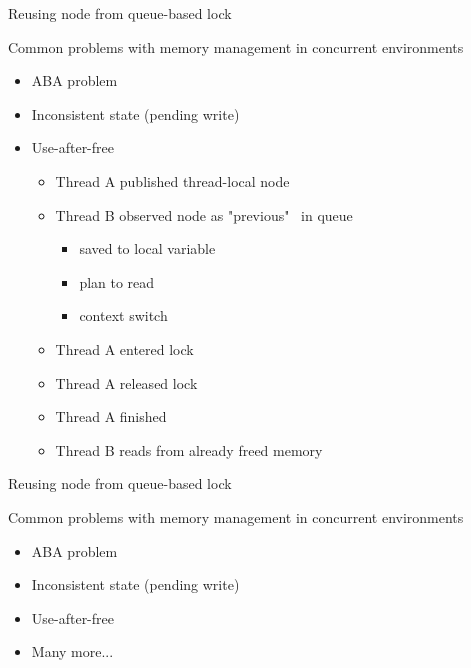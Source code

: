 \begin{frame}[t,noframenumbering]{Reusing node from queue-based lock}

Common problems with memory management in concurrent environments
\begin{itemize}
  \item ABA problem  
  \item Inconsistent state (pending write)
  \pause \item Use-after-free
  \begin{itemize}
    \pause  \item Thread A published thread-local node
    \pause  \item Thread B observed node as "previous" \ in queue
    \begin{itemize}
      \pause  \item saved to local variable
      \pause  \item plan to read
      \pause \item context switch
     \end{itemize}
    \pause  \item Thread A entered lock
    \pause  \item Thread A released lock
    \pause  \item Thread A finished
    \pause  \item Thread B reads from already freed memory
  \end{itemize}
\end{itemize}
\end{frame}


\begin{frame}[t,noframenumbering]{Reusing node from queue-based lock}

Common problems with memory management in concurrent environments
\begin{itemize}
  \item ABA problem
  \item Inconsistent state (pending write)
  \item Use-after-free
  \pause
  \item Many more...
\end{itemize}
\end{frame}


